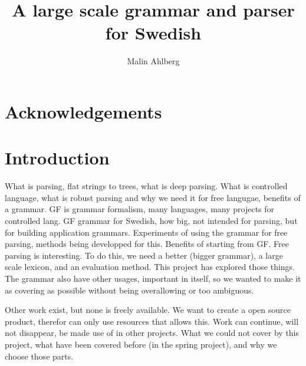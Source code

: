 \documentclass{article}
\begin{document}
\title{A large scale grammar and parser for Swedish}
\author{Malin Ahlberg}
\maketitle
\newpage

\tableofcontents
\newpage

\abstract{
}

\newpage

\section{Acknowledgements}

\newpage

\section{Introduction} 
What is parsing, flat strings to trees, what is deep parsing. What is controlled language,
what is robust parsing and why we need it for free langugae, benefits of a grammar.
GF is grammar formalism, many languages, many projects for controlled lang.
GF grammar for Swedish, how big, not intended for parsing, but for building
application grammars. Experiments of using the grammar for free parsing, methods
being developped for this. Benefits of starting from GF. Free parsing is
interesting. To do this, we need a better (bigger grammar), a large scale
lexicon, and an evaluation method. This project has explored those things. The
grammar also have other usages, important in itself, so we wanted to make it as
covering as possible without being overallowing or too ambiguous.

Other work exist, but none is freely available. We want to create a open source
product, therefor can only use resources that allows this. Work can continue,
will not disappear, be made use of in other projects.
What we could not cover by this project, what have been covered before (in
the spring project), and why we choose those parts.
\end{document}
